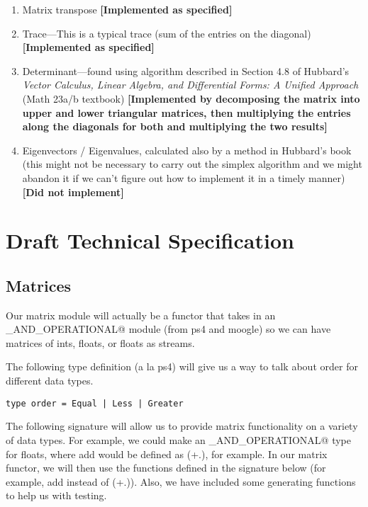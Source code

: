 \documentclass[letterpaper,11pt]{article}
\newcommand{\annot}[1]{\textbf{\color{BrickRed} [#1]}}
\begin{document}
\begin{enumerate}
\item Matrix transpose
{\annot{Implemented as specified}}

\item Trace---This is a typical trace (sum of the entries on the diagonal)
{\annot{Implemented as specified}}

\item Determinant---found using algorithm described in Section 4.8 of Hubbard's
\emph{Vector Calculus, Linear Algebra, and Differential Forms: A Unified
Approach} (Math 23a/b textbook)
{\annot{Implemented by decomposing the matrix into upper and lower triangular
matrices, then multiplying the entries along the diagonals for both and
multiplying the two results}}

\item Eigenvectors / Eigenvalues, calculated also by a method in Hubbard's book
(this might not be necessary to carry out the simplex algorithm and we might
abandon it if we can't figure out how to implement it in a timely manner) 
{\annot{Did not implement}}

\end{enumerate}

\section{Draft Technical Specification}

\subsection{Matrices}

Our matrix module will actually be a functor that takes in an
\verb@ORDERED_AND_OPERATIONAL@ module (from ps4 and moogle) so we can have
matrices of ints, floats, or floats as streams. 

The following type definition (a la ps4) will give us a way to talk about order
for different data types.

\begin{verbatim}
type order = Equal | Less | Greater
\end{verbatim}

The following signature will allow us to provide matrix functionality on a
variety of data types. For example, we could make an
\verb@ORDERED_AND_OPERATIONAL@ type for floats, where add would be defined as
(+.), for example. In our matrix functor, we will then use the functions defined
in the signature below (for example, add instead of (+.)). Also, we have
included some generating functions to help us with testing. 
\end{document}
